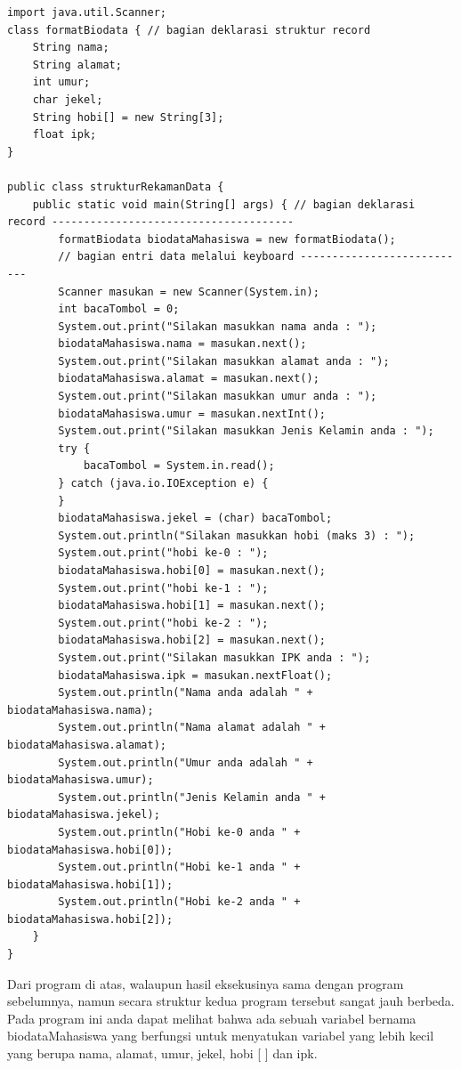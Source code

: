 \documentclass[a4paper,12pt]{article}
\begin{document}
\begin{lstlisting}
import java.util.Scanner;
class formatBiodata { // bagian deklarasi struktur record 
    String nama;
    String alamat;
    int umur;
    char jekel;
    String hobi[] = new String[3];
    float ipk;
}

public class strukturRekamanData {
    public static void main(String[] args) { // bagian deklarasi record --------------------------------------
        formatBiodata biodataMahasiswa = new formatBiodata();
        // bagian entri data melalui keyboard ---------------------------
        Scanner masukan = new Scanner(System.in);
        int bacaTombol = 0;
        System.out.print("Silakan masukkan nama anda : ");
        biodataMahasiswa.nama = masukan.next();
        System.out.print("Silakan masukkan alamat anda : ");
        biodataMahasiswa.alamat = masukan.next();
        System.out.print("Silakan masukkan umur anda : ");
        biodataMahasiswa.umur = masukan.nextInt();
        System.out.print("Silakan masukkan Jenis Kelamin anda : ");
        try {
            bacaTombol = System.in.read();
        } catch (java.io.IOException e) {
        }
        biodataMahasiswa.jekel = (char) bacaTombol;
        System.out.println("Silakan masukkan hobi (maks 3) : ");
        System.out.print("hobi ke-0 : ");
        biodataMahasiswa.hobi[0] = masukan.next();
        System.out.print("hobi ke-1 : ");
        biodataMahasiswa.hobi[1] = masukan.next();
        System.out.print("hobi ke-2 : ");
        biodataMahasiswa.hobi[2] = masukan.next();
        System.out.print("Silakan masukkan IPK anda : ");
        biodataMahasiswa.ipk = masukan.nextFloat();
        System.out.println("Nama anda adalah " + biodataMahasiswa.nama);
        System.out.println("Nama alamat adalah " + biodataMahasiswa.alamat);
        System.out.println("Umur anda adalah " + biodataMahasiswa.umur);
        System.out.println("Jenis Kelamin anda " + biodataMahasiswa.jekel);
        System.out.println("Hobi ke-0 anda " + biodataMahasiswa.hobi[0]);
        System.out.println("Hobi ke-1 anda " + biodataMahasiswa.hobi[1]);
        System.out.println("Hobi ke-2 anda " + biodataMahasiswa.hobi[2]);
    }
}
\end{lstlisting}
Dari program di atas, walaupun hasil eksekusinya sama dengan program sebelumnya, 
namun secara struktur kedua program tersebut sangat jauh berbeda. Pada program ini 
anda  dapat melihat bahwa ada sebuah variabel bernama  biodataMahasiswa yang 
berfungsi untuk menyatukan variabel yang lebih kecil yang berupa nama, alamat, umur, 
jekel, hobi [ ] dan ipk.\\ 
 
\end{document}
